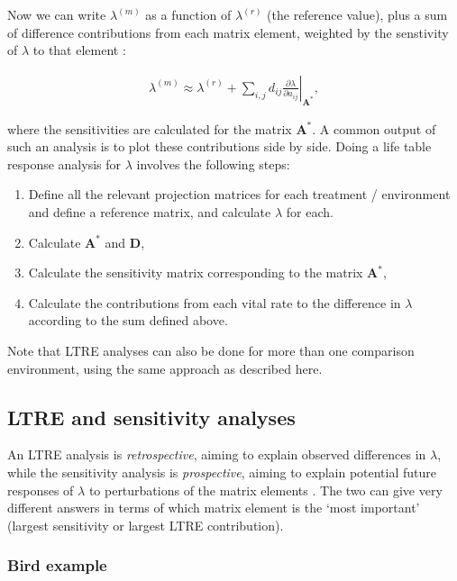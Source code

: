 \documentclass[
]{book}
\begin{document}
Now we can write \(\lambda^{(m)}\) as a function of \(\lambda^{(r)}\) (the reference value), plus a sum of difference contributions from each matrix element, weighted by the senstivity of \(\lambda\) to that element \citep{Caswell1}:

\begin{align}
\lambda^{(m)}\approx \lambda^{(r)}+\sum_{i,j}d_{ij}\left.\frac{\partial\lambda}{\partial a_{ij}}\right|_{\mathbf{A}^*},
\label{eq:LTREeq}
\end{align}

where the sensitivities are calculated for the matrix \(\mathbf{A}^*\). A common output of such an analysis is to plot these contributions side by side. Doing a life table response analysis for \(\lambda\) involves the following steps:

\begin{enumerate}
\def\labelenumi{\arabic{enumi})}
\item
  Define all the relevant projection matrices for each treatment / environment and define a reference matrix, and calculate \(\lambda\) for each.
\item
  Calculate \(\mathbf{A}^*\) and \(\mathbf{D}\),
\item
  Calculate the sensitivity matrix corresponding to the matrix \(\mathbf{A}^*\),
\item
  Calculate the contributions from each vital rate to the difference in \(\lambda\) according to the sum defined above.
\end{enumerate}

Note that LTRE analyses can also be done for more than one comparison environment, using the same approach as described here.

\hypertarget{ltre-and-sensitivity-analyses}{%
\subsection{LTRE and sensitivity analyses}\label{ltre-and-sensitivity-analyses}}

An LTRE analysis is \emph{retrospective}, aiming to explain observed differences in \(\lambda\), while the sensitivity analysis is \emph{prospective}, aiming to explain potential future responses of \(\lambda\) to perturbations of the matrix elements \citep{Caswell1}. The two can give very different answers in terms of which matrix element is the `most important' (largest sensitivity or largest LTRE contribution).

\hypertarget{bird-example-15}{%
\subsubsection*{Bird example}\label{bird-example-15}}
\end{document}
